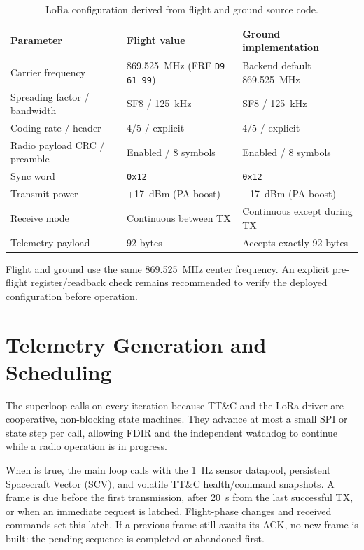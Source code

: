 \begin{table}[H]
\centering
\begin{tabular}{p{4.2cm}p{4.0cm}p{5.5cm}}
\toprule
\textbf{Parameter} & \textbf{Flight value} & \textbf{Ground implementation} \\
\midrule
Carrier frequency & 869.525~MHz (FRF \texttt{D9 61 99}) & Backend default 869.525~MHz \\
Spreading factor / bandwidth & SF8 / 125~kHz & SF8 / 125~kHz \\
Coding rate / header & 4/5 / explicit & 4/5 / explicit \\
Radio payload CRC / preamble & Enabled / 8 symbols & Enabled / 8 symbols \\
Sync word & \texttt{0x12} & \texttt{0x12} \\
Transmit power & +17~dBm (PA boost) & +17~dBm (PA boost) \\
Receive mode & Continuous between TX & Continuous except during TX \\
Telemetry payload & 92 bytes & Accepts exactly 92 bytes \\
\bottomrule
\end{tabular}
\caption{LoRa configuration derived from flight and ground source code.}
\label{tab:ttc-radio-config}
\end{table}

Flight and ground use the same 869.525~MHz center frequency. An explicit
pre-flight register/readback check remains recommended to verify the deployed
configuration before operation.
\section{Telemetry Generation and Scheduling}

The superloop calls  on every iteration because TT\&C
and the LoRa driver are cooperative, non-blocking state machines. They advance
at most a small SPI or state step per call, allowing FDIR and the independent
watchdog to continue while a radio operation is in progress.

When  is true, the main loop calls
 with the 1~Hz
sensor datapool, persistent Spacecraft Vector (SCV), and volatile TT\&C
health/command snapshots. A frame is due before the first transmission, after
20~s from the last successful TX, or when an immediate request is latched.
Flight-phase changes and received commands set this latch. If a previous frame
still awaits its ACK, no new frame is built: the pending sequence is completed
or abandoned first.

